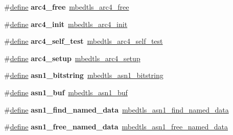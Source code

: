 \begin{DoxyCompactItemize}
\item 
\mbox{\label{compat-1_83_8h_a3c1caa19bc687a5f577feaf72088de87}} 
\#\hyperlink{structdefine}{define} {\bfseries arc4\+\_\+free}~\hyperlink{arc4_8h_a888a4167caf8503e9e82a132c7b89313}{mbedtls\+\_\+arc4\+\_\+free}
\item 
\mbox{\label{compat-1_83_8h_a9f089c9000c9e9c00d62d32327d501c8}} 
\#\hyperlink{structdefine}{define} {\bfseries arc4\+\_\+init}~\hyperlink{arc4_8h_a7795c92c7a8a4b9cf715da081665ccfd}{mbedtls\+\_\+arc4\+\_\+init}
\item 
\mbox{\label{compat-1_83_8h_a3cd097593b8b29bd3864673e98463d9f}} 
\#\hyperlink{structdefine}{define} {\bfseries arc4\+\_\+self\+\_\+test}~\hyperlink{arc4_8h_aba830fee9057fa1c63dcc38c7caf7730}{mbedtls\+\_\+arc4\+\_\+self\+\_\+test}
\item 
\mbox{\label{compat-1_83_8h_ab708989302fb74122e1f7b0c19e01e3e}} 
\#\hyperlink{structdefine}{define} {\bfseries arc4\+\_\+setup}~\hyperlink{arc4_8h_a6a689a989cb433e41181caef8d8bf4ba}{mbedtls\+\_\+arc4\+\_\+setup}
\item 
\mbox{\label{compat-1_83_8h_a052b9500b1594e15085bb9cfc29f588b}} 
\#\hyperlink{structdefine}{define} {\bfseries asn1\+\_\+bitstring}~\hyperlink{structmbedtls__asn1__bitstring}{mbedtls\+\_\+asn1\+\_\+bitstring}
\item 
\mbox{\label{compat-1_83_8h_ad6fa2bb02f1aee2e4a8f0f76203b3273}} 
\#\hyperlink{structdefine}{define} {\bfseries asn1\+\_\+buf}~\hyperlink{structmbedtls__asn1__buf}{mbedtls\+\_\+asn1\+\_\+buf}
\item 
\mbox{\label{compat-1_83_8h_a1a4ad756a2b0e8ffbe099c5d1656d21f}} 
\#\hyperlink{structdefine}{define} {\bfseries asn1\+\_\+find\+\_\+named\+\_\+data}~\hyperlink{asn1_8h_aabe93ade4a012da5d20cf668eededa75}{mbedtls\+\_\+asn1\+\_\+find\+\_\+named\+\_\+data}
\item 
\mbox{\label{compat-1_83_8h_afc04b01befe45a4da102894cf4141492}} 
\#\hyperlink{structdefine}{define} {\bfseries asn1\+\_\+free\+\_\+named\+\_\+data}~\hyperlink{asn1_8h_a46abb857e148f22a616b56b66a781506}{mbedtls\+\_\+asn1\+\_\+free\+\_\+named\+\_\+data}

\end{DoxyCompactItemize}
